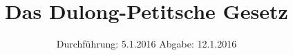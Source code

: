 

\subject{VERSUCH NUMMER 201}
\title{Das Dulong-Petitsche Gesetz}

\date{
  Durchführung: 5.1.2016
  \hspace{3em}
  Abgabe: 12.1.2016
}



\maketitle
\thispagestyle{empty}
\tableofcontents
\newpage








\printbibliography


